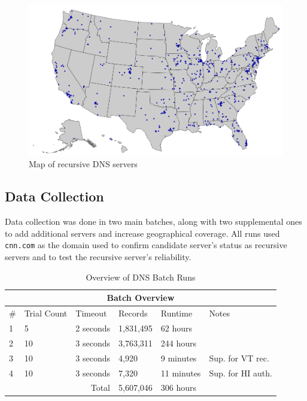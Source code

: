 \begin{figure}[h]
    \centering
    \includegraphics{images/dns/server_locations/rec_server_locations.png}
    \caption{Map of recursive DNS servers}
    \label{fig:dns_cache_manipulation_map_of_recursive_servers}
\end{figure}

\subsection{Data Collection}

Data collection was done in two main batches, along with two supplemental ones to add additional servers and increase geographical coverage. All runs used \texttt{cnn.com} as the domain used to confirm candidate server's status as recursive servers and to test the recursive server's reliability.


\begin{table}[h]
    \centering
    \begin{tabular}{ |p{1cm}||p{2cm}|p{2cm}|p{2cm}|p{2cm}|p{4cm}|  }
     \hline
     \multicolumn{6}{|c|}{Batch Overview} \\
     \hline
     \# & Trial Count & Timeout & Records & Runtime & Notes \\
     \hline
     1 & 5 & 2 seconds & 1,831,495 & 62 hours & \\
     2 & 10 & 3 seconds & 3,763,311 & 244 hours & \\
     3 & 10 & 3 seconds & 4,920 & 9 minutes  & Sup. for VT rec. \\
     4 & 10 & 3 seconds & 7,320 & 11 minutes & Sup. for HI auth. \\
     \hline
     \multicolumn{3}{|r|}{Total} & 5,607,046 & 306 hours & \\
     \hline
    \end{tabular}
    \caption{Overview of DNS Batch Runs}
    \label{tab:dns_batch_overview}
\end{table}

